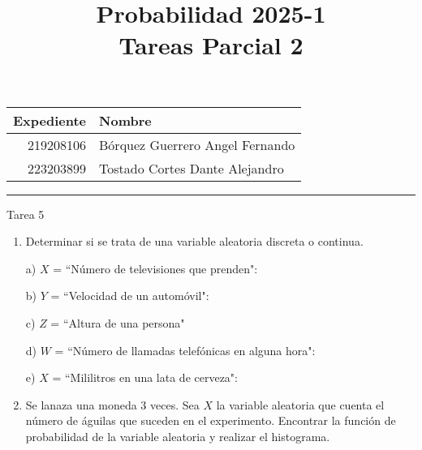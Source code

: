 \documentclass[a4paper, 12pt]{article}
\title
{
  Probabilidad 2025-1 \\
  Tareas Parcial 2
}
\newcommand{\Pspace}{0.5cm}
\newcommand{\Aspace}{0.2cm}
\begin{document}
\maketitle

\begin{center}
    \begin{tabular}{r|l}
        \textbf{Expediente} & \textbf{Nombre} \\ \hline
        219208106 & Bórquez Guerrero Angel Fernando \\
        223203899 & Tostado Cortes Dante Alejandro \\
    \end{tabular}
\end{center}

\rule{\linewidth}{0.3mm}



\vspace{0.3cm}

\begin{center}
    { \LARGE Tarea 5}
\end{center}

\begin{enumerate}
    \item Determinar si se trata de una variable aleatoria discreta o continua.
    \vspace{\Aspace} \par
    a) $X$ = ``Número de televisiones que prenden":
    \\ { \color{azul}  }

    \vspace{\Aspace} \par
    b) $Y$ = ``Velocidad de un automóvil":
    \\ { \color{azul}  }
    
    \vspace{\Aspace} \par
    c) $Z$ = ``Altura de una persona"
    \\ { \color{azul}  }

    \vspace{\Aspace} \par
    d) $W$ = ``Número de llamadas telefónicas en alguna hora":
    \\ { \color{azul}  }

    \vspace{\Aspace} \par
    e) $X$ = ``Mililitros en una lata de cerveza":
    \\ { \color{azul}  }


    \vspace{\Pspace}
    \item Se lanaza una moneda 3 veces. Sea $X$ la variable aleatoria que cuenta el número de águilas que suceden en el experimento. Encontrar la función de probabilidad de la variable aleatoria y realizar el histograma.
    \vspace{\Aspace} \par
    { \color{azul}  }
\end{enumerate}
\end{document}
